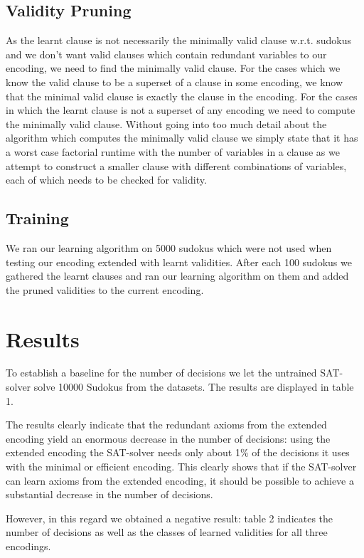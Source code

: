 \documentclass{article}
\begin{document}
\subsection{Validity Pruning} \label{val pruning}
As the learnt clause is not necessarily the minimally valid clause w.r.t. sudokus and we don't want valid clauses which contain redundant variables to our encoding, we need to find the minimally valid clause. For the cases which we know the valid clause to be a superset of a clause in some encoding, we know that the minimal valid clause is exactly the clause in the encoding. For the cases in which the learnt clause is not a superset of any encoding we need to compute the minimally valid clause. Without going into too much detail about the algorithm which computes the minimally valid clause we simply state that it has a worst case factorial runtime with the number of variables in a clause as we attempt to construct a smaller clause with different combinations of variables, each of which needs to be checked for validity.
\subsection{Training} \label{training}
We ran our learning algorithm on 5000 sudokus which were not used when testing our encoding extended with learnt validities. After each 100 sudokus we gathered the learnt clauses and ran our learning algorithm on them and added the pruned validities to the current encoding.


\section{Results} \label{results}

To establish a baseline for the number of decisions we let the untrained SAT-solver solve 10000 Sudokus from the datasets. The results are displayed in table 1. %

The results clearly indicate that the redundant axioms from the extended encoding yield an enormous decrease in the number of decisions: using the extended encoding the SAT-solver needs only about 1\% of the decisions it uses with the minimal or efficient encoding. This clearly shows that if the SAT-solver can learn axioms from the extended encoding, it should be possible to achieve a substantial decrease in the number of decisions.

However, in this regard we obtained a negative result: table 2 indicates the number of decisions as well as the classes of learned validities for all three encodings. %
\end{document}
